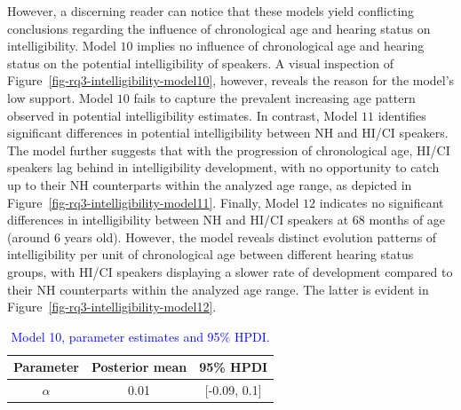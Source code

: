 \documentclass[
  authoryear,
  preprint,
  1p]{elsarticle}
\begin{document}
However, a discerning reader can notice that these models yield
conflicting conclusions regarding the influence of chronological age and
hearing status on intelligibility. Model \(10\) implies no influence of
chronological age and hearing status on the potential intelligibility of
speakers. A visual inspection of
Figure~\ref{fig-rq3-intelligibility-model10}, however, reveals the
reason for the model's low support. Model \(10\) fails to capture the
prevalent increasing age pattern observed in potential intelligibility
estimates. In contrast, Model \(11\) identifies significant differences
in potential intelligibility between NH and HI/CI speakers. The model
further suggests that with the progression of chronological age, HI/CI
speakers lag behind in intelligibility development, with no opportunity
to catch up to their NH counterparts within the analyzed age range, as
depicted in Figure~\ref{fig-rq3-intelligibility-model11}. Finally, Model
\(12\) indicates no significant differences in intelligibility between
NH and HI/CI speakers at \(68\) months of age (around \(6\) years old).
However, the model reveals distinct evolution patterns of
intelligibility per unit of chronological age between different hearing
status groups, with HI/CI speakers displaying a slower rate of
development compared to their NH counterparts within the analyzed age
range. The latter is evident in
Figure~\ref{fig-rq3-intelligibility-model12}.

\begin{longtable}[]{@{}ccc@{}}

\caption{\label{tbl-parameter-model10}\textcolor{blue}{Model 10, parameter estimates and
95\% HPDI.}}

\tabularnewline

\toprule\noalign{}
Parameter & Posterior mean & 95\% HPDI \\
\midrule\noalign{}
\endhead
\bottomrule\noalign{}
\endlastfoot
\(\alpha\) & 0.01 & {[}-0.09, 0.1{]} \\

\end{longtable}
\end{document}
